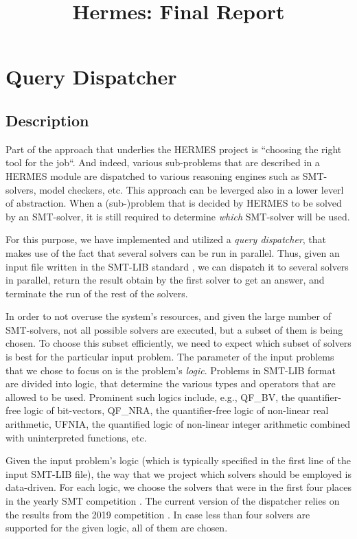 \documentclass{article}
\title{Hermes: Final Report}
\begin{document}
\maketitle

\section{Query Dispatcher}
\subsection{Description}
Part of the approach that underlies the HERMES project is
``choosing the right tool for the job``.
And indeed, various sub-problems that are described in
a HERMES module are dispatched to various
reasoning engines such as SMT-solvers, model checkers, etc.
This approach can be leverged also in a lower leverl of abstraction.
When a (sub-)problem that is decided by HERMES to be solved by an SMT-solver, it is still
required to determine \emph{which} SMT-solver will be used.

For this purpose, we have implemented and utilized a
{\em query dispatcher}, that
makes use of the fact that several solvers
can be run in parallel.
Thus, given an input file written in the SMT-LIB standard \cite{SMTLib2010}, we can dispatch it to several solvers in parallel,
return the result obtain by the first solver to get an answer, and
terminate the run of the rest of the solvers.

In order to not overuse the system's resources, and given the large number of SMT-solvers,
not all possible solvers are executed, but a subset of them is being chosen.
To choose this subset efficiently, we need to expect which subset of solvers is best
for the particular input problem.
The parameter of the input problems that we chose to focus on is the problem's {\em logic}.
Problems in SMT-LIB format are divided into logic, that determine the various types and operators
that are allowed to be used.
Prominent such logics include, e.g.,
QF\_BV, the quantifier-free logic of bit-vectors,
QF\_NRA, the quantifier-free logic of non-linear real arithmetic,
UFNIA, the quantified logic of non-linear integer arithmetic combined with uninterpreted functions, etc.

Given the input problem's logic (which is typically specified in the first line of the input SMT-LIB file), the way that we project which solvers should be employed is data-driven.
For each logic, we choose the solvers that were in the first four places in
the yearly SMT competition \cite{DBLP:journals/jsat/WeberCDHNR19}.
The current version of the dispatcher relies on the results from the 2019 competition \cite{smtcomp2019}.
In case less than four solvers are supported for the given logic, all of them are chosen.
\end{document}

